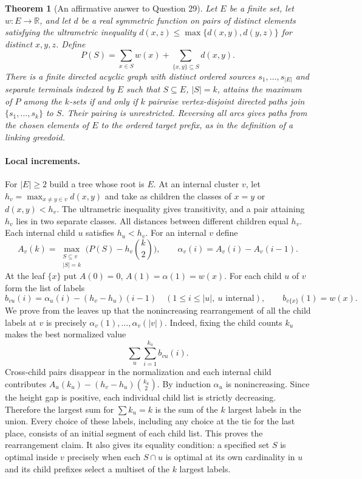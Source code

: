 \documentclass[11pt,a4paper]{article}
\newtheorem{theorem}{Theorem}[section]
\begin{document}
\begin{theorem}[An affirmative answer to Question 29]\label{thm:gp}
Let $E$ be a finite set, let $w:E\to\mathbb R$, and let $d$ be a real symmetric
function on pairs of distinct elements satisfying the ultrametric inequality
$d(x,z)\le\max\{d(x,y),d(y,z)\}$ for distinct $x,y,z$. Define
\[
 P(S)=\sum_{x\in S}w(x)+\sum_{\{x,y\}\subseteq S}d(x,y).
\]
There is a finite directed acyclic graph with distinct ordered sources
$s_1,\ldots,s_{|E|}$ and separate terminals indexed by $E$ such that
$S\subseteq E$, $|S|=k$, attains the maximum of $P$ among the $k$-sets
if and only if $k$ pairwise vertex-disjoint directed paths join
$\{s_1,\ldots,s_k\}$ to $S$. Their pairing is unrestricted.
Reversing all arcs gives paths from the chosen elements of $E$ to the ordered target prefix, as in the definition of a linking greedoid.
\end{theorem}

\paragraph{Local increments.}
For $|E|\ge 2$ build a tree whose root is $E$.
At an internal cluster $v$, let
$h_v=\max_{x\ne y\in v}d(x,y)$ and take as children the classes of
$x=y$ or $d(x,y)<h_v$. The ultrametric inequality gives transitivity,
and a pair attaining $h_v$ lies in two separate classes.
All distances between different children equal $h_v$.
Each internal child $u$ satisfies $h_u<h_v$.
For an internal $v$ define
\[
 A_v(k)=\max_{\substack{S\subseteq v\\|S|=k}}
             \biggl(P(S)-h_v\binom{k}{2}\biggr),
 \qquad
 \alpha_v(i)=A_v(i)-A_v(i-1).
\]
At the leaf $\{x\}$ put $A(0)=0$, $A(1)=\alpha(1)=w(x)$.
For each child $u$ of $v$ form the list of labels
\[
 b_{vu}(i)=\alpha_u(i)-(h_v-h_u)(i-1)
 \quad(1\le i\le |u|,\ u\text{ internal}),\qquad
 b_{v\{x\}}(1)=w(x).
\]
We prove from the leaves up that the nonincreasing rearrangement of all the
child labels at $v$ is precisely $\alpha_v(1),\ldots,\alpha_v(|v|)$.
Indeed, fixing the child counts $k_u$ makes the best normalized value
\[
 \sum_{u}\sum_{i=1}^{k_u} b_{vu}(i).
\]
Cross-child pairs disappear in the normalization and each internal
child contributes $A_u(k_u)-(h_v-h_u)\binom{k_u}{2}$.
By induction $\alpha_u$ is nonincreasing. Since the height gap is positive,
each individual child list is strictly decreasing. Therefore the largest
sum for $\sum k_u=k$ is the sum of the $k$ largest labels in the union.
Every choice of these labels, including any choice at the tie for the last
place, consists of an initial segment of each child list.
This proves the rearrangement claim. It also gives its equality condition:
a specified set $S$ is optimal inside $v$ precisely when each
$S\cap u$ is optimal at its own cardinality in $u$ and its child prefixes
select a multiset of the $k$ largest labels.
\end{document}
